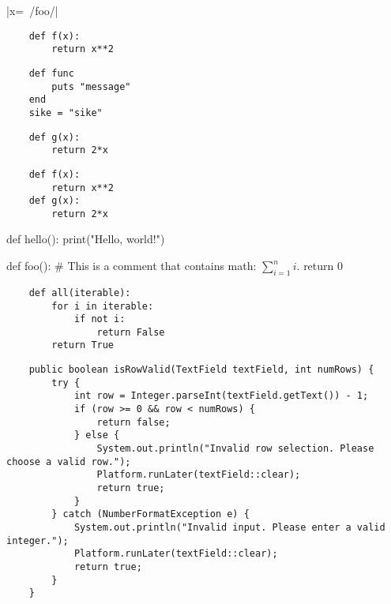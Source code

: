 \documentclass{article}
\begin{document}
|x=~/foo/|


\begin{verbatim}
    def f(x):
        return x**2
\end{verbatim}
\begin{verbatim}
    def func
        puts "message"
    end
    sike = "sike"
\end{verbatim}
\begin{verbatim}
    def g(x):
        return 2*x
\end{verbatim}

\begin{verbatim} 
    def f(x):
        return x**2
    def g(x):
        return 2*x    
\end{verbatim}

\begin{coolminted}
    def hello():
        print("Hello, world!")
\end{coolminted}

\begin{coolminted}
    def foo():
    # This is a comment that contains math: $\sum_{i=1}^{n} i$.     
       return 0
\end{coolminted}


\renewcommand{\theFancyVerbLine}{
    \sffamily
    \textcolor[rgb]{0.5,0.5,1.0}{
        \scriptsize\oldstylenums{
            \arabic{FancyVerbLine}}}}
\begin{verbatim}
    def all(iterable):
        for i in iterable:
            if not i:
                return False
        return True
\end{verbatim}

\begin{verbatim}
    public boolean isRowValid(TextField textField, int numRows) {
        try {
            int row = Integer.parseInt(textField.getText()) - 1;
            if (row >= 0 && row < numRows) {
                return false;
            } else {
                System.out.println("Invalid row selection. Please choose a valid row.");
                Platform.runLater(textField::clear);
                return true;
            }
        } catch (NumberFormatException e) {
            System.out.println("Invalid input. Please enter a valid integer.");
            Platform.runLater(textField::clear);
            return true;
        }
    }
\end{verbatim}
\end{document}
